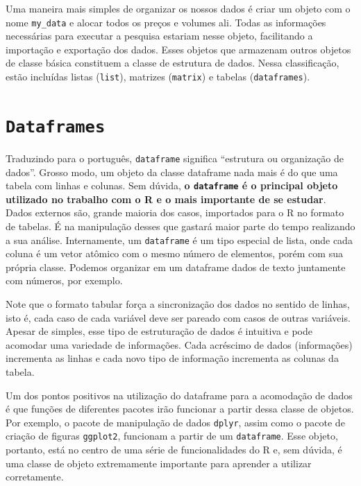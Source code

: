 \documentclass[
  11pt,
]{book}
\begin{document}
Uma maneira mais simples de organizar os nossos dados é criar um objeto com o nome \texttt{my\_data} e alocar todos os preços e volumes ali. Todas as informações necessárias para executar a pesquisa estariam nesse objeto, facilitando a importação e exportação dos dados. Esses objetos que armazenam outros objetos de classe básica constituem a classe de estrutura de dados. Nessa classificação, estão incluídas listas (\texttt{list}), matrizes (\texttt{matrix}) e tabelas (\texttt{dataframes}).

\hypertarget{dataframes}{%
\section{\texorpdfstring{\texttt{Dataframes}}{Dataframes}}\label{dataframes}}

Traduzindo para o português, \texttt{dataframe} significa ``estrutura ou organização de dados''. Grosso modo, um objeto da classe dataframe nada mais é do que uma tabela com linhas e colunas. Sem dúvida, \textbf{o \texttt{dataframe} é o principal objeto utilizado no trabalho com o R e o mais importante de se estudar}. Dados externos são, grande maioria dos casos, importados para o R no formato de tabelas. É na manipulação desses que gastará maior parte do tempo realizando a sua análise. Internamente, um \texttt{dataframe} é um tipo especial de lista, onde cada coluna é um vetor atômico com o mesmo número de elementos, porém com sua própria classe. Podemos organizar em um dataframe dados de texto juntamente com números, por exemplo.

Note que o formato tabular força a sincronização dos dados no sentido de linhas, isto é, cada caso de cada variável deve ser pareado com casos de outras variáveis. Apesar de simples, esse tipo de estruturação de dados é intuitiva e pode acomodar uma variedade de informações. Cada acréscimo de dados (informações) incrementa as linhas e cada novo tipo de informação incrementa as colunas da tabela.

Um dos pontos positivos na utilização do dataframe para a acomodação de dados é que funções de diferentes pacotes irão funcionar a partir dessa classe de objetos. Por exemplo, o pacote de manipulação de dados \texttt{dplyr}, assim como o pacote de criação de figuras \texttt{ggplot2}, funcionam a partir de um \texttt{dataframe}. Esse objeto, portanto, está no centro de uma série de funcionalidades do R e, sem dúvida, é uma classe de objeto extremamente importante para aprender a utilizar corretamente.
\end{document}
